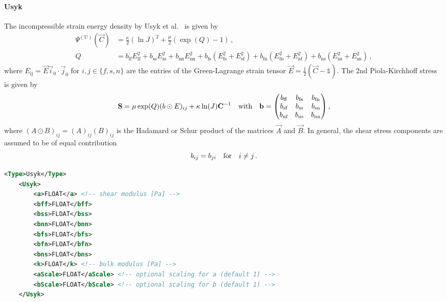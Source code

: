 \paragraph{Usyk}
The incompressible strain energy density by Usyk et al.~\cite{Usyk-2000-ID14569} is given by
\begin{align}
    \Psi^{(\mathrm{U})} (\vec C) &= \frac{\kappa}{2} (\ln{J})^2 + \frac{\mu}{2}(\exp(Q) -1) \,, \nonumber\\
    Q &= b_\text{ff} E_\text{ff}^2 + b_\text{ss} E_\text{ss}^2 + b_\text{nn} E_\text{nn}^2
         + b_\text{fs} (E_\text{fs}^2 + E_\text{sf}^2) + b_\text{fn} (E_\text{fn}^2 + E_\text{nf}^2)
         + b_\text{ns} (E_\text{ns}^2 + E_\text{sn}^2) \,, \label{eq:usyk}
\end{align}
where $E_\text{ij} = \vec E \vec i_0 \cdot \vec j_0$ for $i,j \in \{f,s,n\}$ are the entries of the Green-Lagrange strain tensor ${\vec E = \frac{1}{2}(\vec C - \mathds{1})}$.
The 2nd Piola-Kirchhoff stress is given by
\begin{equation}
    \vec S = 
    \mu \exp(Q) (b \odot E)_{ij} + \kappa \ln(J) \vec C^{-1} \qq{with} \vec b = \mqty( b_\text{ff} &  b_\text{fs} &  b_\text{fn} \\ 
    b_\text{sf} &  b_\text{ss} &  b_\text{sn} \\ 
    b_\text{nf} &  b_\text{ns} &  b_\text{nn}) \,,
\end{equation}
where $(A \odot B)_{ij} = (A)_{ij}(B)_{ij}$ is the Hadamard or Schur product of the matrices $\vec A$ and $\vec B$.
In general, the shear stress components are assumed to be of equal contribution 
\begin{equation}
    b_{ij} = b_{ji} \qfor i \neq j \,.
\end{equation}

\begin{lstlisting}[language=XML,caption=.xml settings for Usyk material]
    <Type>Usyk</Type>
    <Usyk>
        <a>FLOAT</a> <!-- shear modulus [Pa] -->
        <bff>FLOAT</bff>
        <bss>FLOAT</bss>
        <bnn>FLOAT</bnn>
        <bfs>FLOAT</bfs>
        <bfn>FLOAT</bfn>
        <bns>FLOAT</bns>
        <k>FLOAT</k> <!-- bulk modulus [Pa] -->
        <aScale>FLOAT</aScale> <!-- optional scaling for a (default 1) -->
        <bScale>FLOAT</bScale> <!-- optional scaling for b (default 1) -->
    </Usyk>
\end{lstlisting}

